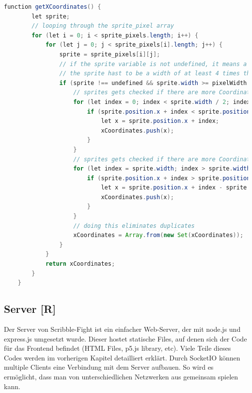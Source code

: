 \begin{lstlisting}[caption=Bestimmung gültiger X-Koordinaten,language=Java,label=lst:impl:xCoords]
    function getXCoordinates() {
        let sprite;
        // looping through the sprite_pixel array
        for (let i = 0; i < sprite_pixels.length; i++) {
            for (let j = 0; j < sprite_pixels[i].length; j++) {
                sprite = sprite_pixels[i][j];
                // if the sprite variable is not undefined, it means a sprite exists there
                // the sprite hast to be a width of at least 4 times the normal pixel width
                if (sprite !== undefined && sprite.width >= pixelWidth * 4) {
                    // sprites gets checked if there are more Coordinates to let an item spawn there (to the right of the center)
                    for (let index = 0; index < sprite.width / 2; index += pixelWidth * 2) {
                        if (sprite.position.x + index < sprite.position.x + sprite.width / 2) {
                            let x = sprite.position.x + index;
                            xCoordinates.push(x);
                        }
                    }
                    // sprites gets checked if there are more Coordinates to let an item spawn there (to the left of the center)
                    for (let index = sprite.width; index > sprite.width / 2; index -= pixelWidth * 2) {
                        if (sprite.position.x + index > sprite.position.x + sprite.width / 2) {
                            let x = sprite.position.x + index - sprite.width;
                            xCoordinates.push(x);
                        }
                    }
                    // doing this eliminates duplicates
                    xCoordinates = Array.from(new Set(xCoordinates));
                }
            }
            return xCoordinates;
        }
    }
\end{lstlisting}




\subsection{Server [R]}
Der Server von Scribble-Fight ist ein einfacher Web-Server, der mit node.js und express.js umgesetzt wurde. 
Dieser hostet statische Files, auf denen sich der Code für das Frontend befindet (HTML Files, p5.js library, etc).
Viele Teile dieses Codes werden im vorherigen Kapitel detailliert erklärt. 
Durch SocketIO können multiple Clients eine Verbindung mit dem Server aufbauen.
So wird es ermöglicht, dass man von unterschiedlichen Netzwerken aus gemeinsam spielen kann. 

